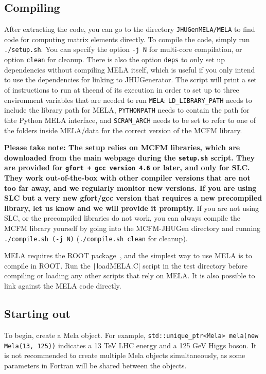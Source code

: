 \documentclass[aps,superscriptaddress,nofootinbib]{revtex4}
\begin{document}
\subsection{Compiling}
After extracting the code, you can go to the directory \texttt{JHUGenMELA/MELA} to find code for computing matrix elements directly.
To compile the code, simply run \texttt{./setup.sh}. You can specify the option \verb|-j N| for multi-core compilation, or option \verb|clean| for cleanup. There is also the option \verb|deps| to only set up dependencies without compiling MELA itself, which is useful if you only intend to use the dependencies for linking to JHUGenerator. The script will print a set of instructions to run at theend of its execution in order to set up to three environment variables that are needed to run \texttt{MELA}: \texttt{LD\_LIBRARY\_PATH} needs to include the library path for MELA, \texttt{PYTHONPATH} needs to contain the path for thte Python MELA interface, and \texttt{SCRAM\_ARCH} needs to be set to refer to one of the folders inside MELA/data for the correct version of the MCFM library.

\textbf{Please take note: The setup relies on MCFM libraries, which are downloaded from the main webpage during the \texttt{setup.sh} script.  They are provided for \texttt{gfort + gcc version 4.6} or later, and only for SLC. They work out-of-the-box with other compiler versions that are not too far away, and we regularly monitor new versions. If you are using SLC but a very new gfort/gcc version that requires a new precompiled library, let us know and we will provide it promptly.}
If you are not using SLC, or the precompiled libraries do not work, you can always compile the MCFM library yourself by going into the MCFM-JHUGen directory and running \verb|./compile.sh (-j N)| (\verb|./compile.sh clean| for cleanup).

MELA requires the ROOT package~\cite{root}, and the simplest way to use MELA is to compile in ROOT.  Run the \texttt|loadMELA.C| script in the test directory before compiling or loading any other scripts that rely on MELA.  It is also possible to link against the MELA code directly.
\subsection{Starting out}
To begin, create a Mela object.  For example, \verb|std::unique_ptr<Mela> mela(new Mela(13, 125))| indicates a 13 TeV LHC energy and a 125 GeV Higgs boson.  It is not recommended to create multiple Mela objects simultaneously, as some parameters in Fortran will be shared between the objects.
\end{document}

